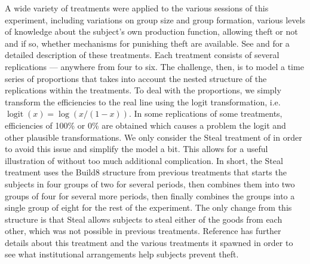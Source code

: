 \documentclass[graybox]{svmult}
\DeclareMathOperator{\logit}{logit}
\begin{document}
A wide variety of treatments were applied to the various sessions of this experiment, including variations on group size and group formation, various levels of knowledge about the subject's own production function, allowing theft or not and if so, whether mechanisms for punishing theft are available. See \cite{crockett2009exchange} and \cite{kimbrough2010exchange} for a detailed description of these treatments. Each treatment consists of several replications --- anywhere from four to six. The challenge, then, is to model a time series of proportions that takes into account the nested structure of the replications within the treatments. To deal with the proportions, we simply transform the efficiencies to the real line using the logit transformation, i.e. $\logit(x)=\log(x/(1-x))$. In some replications of some treatments, efficiencies of 100\% or 0\% are obtained which causes a problem the logit and other plausible transformations. We only consider the Steal treatment of \cite{kimbrough2010exchange} in order to avoid this issue and simplify the model a bit. This allows for a useful illustration of \cite{simpson2014interweaving} without too much additional complication. In short, the Steal treatment uses the Build8 structure from previous treatments that starts the subjects in four groups of two for several periods, then combines them into two groups of four for several more periods, then finally combines the groups into a single group of eight for the rest of the experiment. The only change from this structure is that Steal allows subjects to steal either of the goods from each other, which was not possible in previous treatments. Reference \cite{kimbrough2010exchange} has further details about this treatment and the various treatments it spawned in order to see what institutional arrangements help subjects prevent theft.
\end{document}
